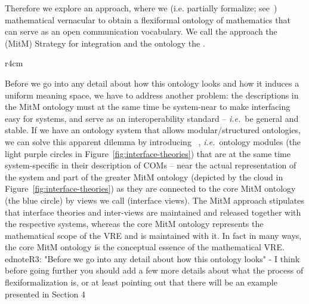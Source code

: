 Therefore we explore an approach, where we  (i.e. partially formalize;
see~\cite{Kohlhase:tffm13}) mathematical vernacular to obtain a flexiformal ontology of
mathematics that can serve as an open communication vocabulary. We call the approach the
 (MitM) Strategy for integration and the ontology the .

\begin{wrapfigure}r{4cm}\vspace*{-1.5em}
  \vspace*{-.5em}
  \caption{Interface theories}\label{fig:interface-theories}\vspace*{-1em}
\end{wrapfigure}
Before we go into any detail about how this ontology looks and how it induces a uniform
meaning space, we have to address another problem: the descriptions in the MitM ontology
must at the same time be system-near to make interfacing easy for systems, and serve as
an interoperability standard -- \emph{i.e.}\ be general and stable. If we have an ontology system
that allows modular/structured ontologies, we can solve this apparent dilemma by
introducing ~\cite{KohRabSac:fvip11}, \emph{i.e.}\ ontology modules
(the light purple circles in Figure~\ref{fig:interface-theories}) that are at the same
time system-specific in their description of COMs -- near the actual representation of the
system and part of the greater MitM ontology (depicted by the cloud in
Figure~\ref{fig:interface-theories}) as they are connected to the core MitM ontology (the
blue circle) by views we call  (interface views). 
The MitM approach
stipulates that interface theories and inter-views are maintained and released together with
the respective systems, whereas the core MitM ontology represents the mathematical scope
of the VRE and is maintained with it. In fact in many ways, the core MitM ontology is the
conceptual essence of the mathematical VRE.
\\ednote{R3: "Before we go into any detail about how this ontology looks" - I think before going 
further you should add a few more details about what the process of flexiformalization is, 
or at least pointing out that there will be an example presented in Section 4}

